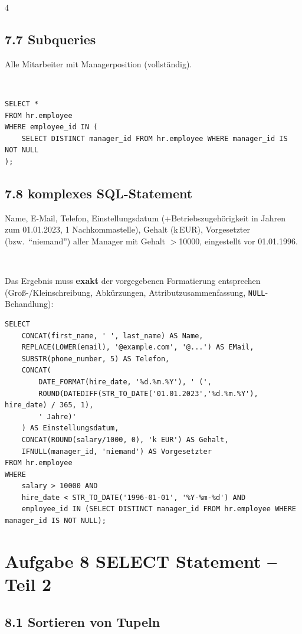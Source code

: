 \documentclass[8pt,a4paper]{extarticle}
\newcommand{\Kopf}[1]{}
\newenvironment{loesung}[1][]{%
    \par\noindent{\bfseries\color{loesungrahmen}\small$\blacktriangleright$~L\"osung#1:}~%
}{\par\smallskip}
\begin{document}
\begin{multicols}{4}
\subsection*{7.7 \quad Subqueries}
Alle Mitarbeiter mit Managerposition (vollst\"andig).
\begin{loesung}
\begin{lstlisting}
SELECT *
FROM hr.employee
WHERE employee_id IN (
    SELECT DISTINCT manager_id FROM hr.employee WHERE manager_id IS NOT NULL
);
\end{lstlisting}
\end{loesung}

\subsection*{7.8 \quad komplexes SQL-Statement}
Name, E-Mail, Telefon, Einstellungsdatum (+Betriebszugeh\"origkeit in Jahren zum 01.01.2023, 1 Nachkommastelle), Gehalt (k\,EUR), Vorgesetzter (bzw.\ ``niemand'') aller Manager mit Gehalt $>$10000, eingestellt vor 01.01.1996.
\begin{loesung}
Das Ergebnis muss \textbf{exakt} der vorgegebenen Formatierung entsprechen (Gro\ss{}-/Kleinschreibung, Abk\"urzungen, Attributzusammenfassung, \texttt{NULL}-Behandlung):
\begin{lstlisting}
SELECT
    CONCAT(first_name, ' ', last_name) AS Name,
    REPLACE(LOWER(email), '@example.com', '@...') AS EMail,
    SUBSTR(phone_number, 5) AS Telefon,
    CONCAT(
        DATE_FORMAT(hire_date, '%d.%m.%Y'), ' (',
        ROUND(DATEDIFF(STR_TO_DATE('01.01.2023','%d.%m.%Y'), hire_date) / 365, 1),
        ' Jahre)'
    ) AS Einstellungsdatum,
    CONCAT(ROUND(salary/1000, 0), 'k EUR') AS Gehalt,
    IFNULL(manager_id, 'niemand') AS Vorgesetzter
FROM hr.employee
WHERE
    salary > 10000 AND
    hire_date < STR_TO_DATE('1996-01-01', '%Y-%m-%d') AND
    employee_id IN (SELECT DISTINCT manager_id FROM hr.employee WHERE manager_id IS NOT NULL);
\end{lstlisting}
\end{loesung}


\section*{Aufgabe 8 \quad SELECT Statement -- Teil 2}
\Kopf{Aufgabe 8 SELECT Statement - Teil 2}

\subsection*{8.1 \quad Sortieren von Tupeln}

\end{multicols}
\end{document}
